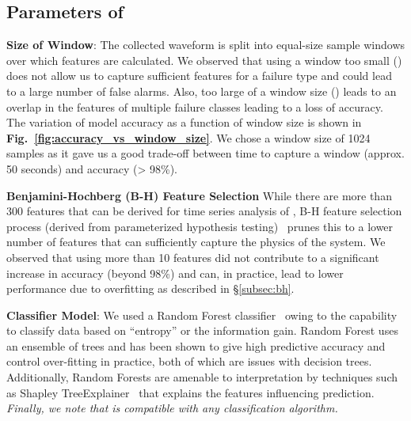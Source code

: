 \subsection{Parameters of \sol}
\label{subsec:prac} 
\ci \textbf{Size of Window}: The collected \aout waveform is split into equal-size sample windows over which features are calculated. We observed that using a window too small () does not allow us to capture sufficient features for a failure type and could lead to a large number of false alarms. Also, too large of a window size () leads to an overlap in the features of multiple failure classes leading to a loss of accuracy. The variation of model accuracy as a function of window size is shown in {\bfseries Fig.~\ref{fig:accuracy_vs_window_size}}. We chose a window size of 1024 samples 
as it gave us a good trade-off between time to capture a window (approx. 50 seconds) and accuracy (> 98\%).

\cii \textbf{Benjamini-Hochberg (B-H) Feature Selection} While there are more than 300 features that can be derived for time series analysis of \aout, B-H feature selection process (derived from parameterized hypothesis testing)~\cite{benjamini1995controlling,christ2018time} prunes this to a lower number of features that can sufficiently capture the physics of the system. We observed that using more than 10 features did not contribute to a significant increase in accuracy (beyond 98\%) and can, in practice, lead to lower performance due to overfitting as described in \S\ref{subsec:bh}.%

\ciii \textbf{Classifier Model}: We used a Random Forest classifier~\cite{polikar2012ensemble, breiman2001random} owing to the capability to classify data based on ``entropy'' or the information gain.  %
Random Forest uses an ensemble of trees and has been shown to give high predictive accuracy and control over-fitting in practice, both of which are issues with decision trees. Additionally, Random Forests are amenable to interpretation by techniques such as Shapley TreeExplainer~\cite{lundberg2020local2global} that explains the features influencing prediction. \textit{Finally, we note that \aout is compatible with any classification algorithm.}





